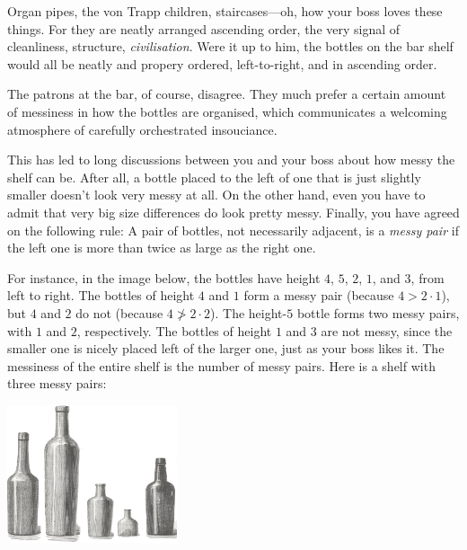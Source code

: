 

Organ pipes, the von Trapp children, staircases---oh, how your boss loves these things.
For they are neatly arranged ascending order, the very signal of cleanliness, structure, \emph{civilisation}.
Were it up to him, the bottles on the bar shelf would all be neatly and propery ordered, left-to-right, and in ascending order.

The patrons at the bar, of course, disagree.
They much prefer a certain amount of messiness in how the bottles are organised, which communicates a welcoming atmosphere of carefully orchestrated insouciance. 

This has led to long discussions between you and your boss about how messy the shelf can be.
After all, a bottle placed to the left of one that is just slightly smaller doesn't look very messy at all.
On the other hand, even you have to admit that very big size differences do look pretty messy.
Finally, you have agreed on the following rule:
A pair of bottles, not necessarily adjacent, is a \emph{messy pair} if the left one is more than twice as large as the right one.

\medskip
For instance, in the image below, the bottles have height $4$, $5$, $2$, $1$, and $3$, from left to right.
The bottles of height $4$ and $1$ form a messy pair (because $4 > 2\cdot 1$), but $4$ and $2$ do not (because $4\not> 2\cdot 2$).
The height-$5$ bottle forms two messy pairs, with $1$ and $2$, respectively.
The bottles of height $1$ and $3$ are not messy, since the smaller one is nicely placed left of the larger one, just as your boss likes it.
The messiness of the entire shelf is the number of messy pairs.
Here is a shelf with three messy pairs:

\medskip
\includegraphics[width = 5cm]{img/messy_bottles.png}



